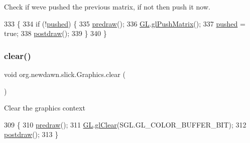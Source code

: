 Check if we\textquotesingle{}ve pushed the previous matrix, if not then push it now. 
\begin{DoxyCode}
333                              \{
334         \textcolor{keywordflow}{if} (!\mbox{\hyperlink{classorg_1_1newdawn_1_1slick_1_1_graphics_a41f09c172e96932127afa698a0f81db3}{pushed}}) \{
335             \mbox{\hyperlink{classorg_1_1newdawn_1_1slick_1_1_graphics_a7b4c203181e3b6302d51ed9b24596b8d}{predraw}}();
336             \mbox{\hyperlink{classorg_1_1newdawn_1_1slick_1_1_graphics_a39ca68db81b225982a4421c4a6835eed}{GL}}.\mbox{\hyperlink{interfaceorg_1_1newdawn_1_1slick_1_1opengl_1_1renderer_1_1_s_g_l_ae9904a980aa014796bf1dcd748b63056}{glPushMatrix}}();
337             \mbox{\hyperlink{classorg_1_1newdawn_1_1slick_1_1_graphics_a41f09c172e96932127afa698a0f81db3}{pushed}} = \textcolor{keyword}{true};
338             \mbox{\hyperlink{classorg_1_1newdawn_1_1slick_1_1_graphics_abe054371d1486618ff327bbbcf02ff97}{postdraw}}();
339         \}
340     \}
\end{DoxyCode}
\mbox{\label{classorg_1_1newdawn_1_1slick_1_1_graphics_ac02dc23222f4d0d1498f38e27bf96a49}} 
\subsubsection{\texorpdfstring{clear()}{clear()}}
{\footnotesize\ttfamily void org.\+newdawn.\+slick.\+Graphics.\+clear (\begin{DoxyParamCaption}{ }\end{DoxyParamCaption})\hspace{0.3cm}{\ttfamily [inline]}}

Clear the graphics context 
\begin{DoxyCode}
309                         \{
310         \mbox{\hyperlink{classorg_1_1newdawn_1_1slick_1_1_graphics_a7b4c203181e3b6302d51ed9b24596b8d}{predraw}}();
311         \mbox{\hyperlink{classorg_1_1newdawn_1_1slick_1_1_graphics_a39ca68db81b225982a4421c4a6835eed}{GL}}.\mbox{\hyperlink{interfaceorg_1_1newdawn_1_1slick_1_1opengl_1_1renderer_1_1_s_g_l_a254bdaa78a48f3fd3fd4ada15c910d4a}{glClear}}(SGL.GL\_COLOR\_BUFFER\_BIT);
312         \mbox{\hyperlink{classorg_1_1newdawn_1_1slick_1_1_graphics_abe054371d1486618ff327bbbcf02ff97}{postdraw}}();
313     \}
\end{DoxyCode}
\mbox{\label{classorg_1_1newdawn_1_1slick_1_1_graphics_a105163751bd22bbd21569c17e1753671}} 
